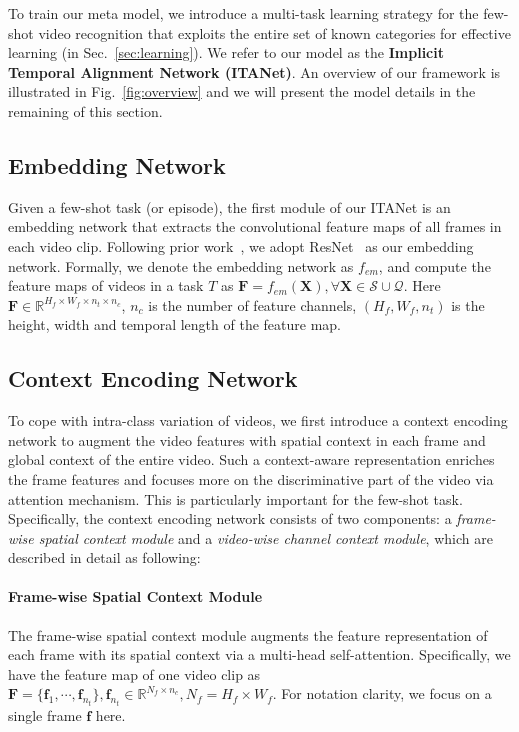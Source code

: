 \documentclass{article}
\begin{document}
To train our meta model, we introduce a multi-task learning strategy for the few-shot video recognition that exploits the entire set of known categories for effective learning (in Sec.~\ref{sec:learning}).
We refer to our model as the \textbf{Implicit Temporal Alignment Network (ITANet)}. An overview of our framework is illustrated in Fig.~\ref{fig:overview} and we will present the model details in the remaining of this section.


\subsection{Embedding Network}\label{sec:embedding}
Given a few-shot task (or episode), the first module of our ITANet is an embedding network that extracts the convolutional feature maps of all frames in each video clip. Following prior work~\cite{cao2020few,zhu2018compound}, we adopt ResNet~\cite{he2016deep} as our embedding network. Formally, we denote the embedding network as $f_{em}$, and compute the feature maps of videos in a task $T$ as $\mathbf{F}=f_{em}(\mathbf{X}), \forall \mathbf{X}\in \mathcal{S}\cup\mathcal{Q}$. Here $\mathbf{F}\in\mathbb{R}^{H_f\times W_f\times n_t\times n_{c}}$, $n_{c}$ is the number of feature channels, $(H_f,W_f,n_t)$ is the height, width and temporal length of the feature map.

\subsection{Context Encoding Network}\label{sec:context}
To cope with intra-class variation of videos, we first introduce a context encoding network to augment the video features with spatial context in each frame and global context of the entire video. Such a context-aware representation enriches the frame features and focuses more on the discriminative part of the video via attention mechanism. This is particularly important for the few-shot task. Specifically, the context encoding network consists of two components: a \textit{frame-wise spatial context module} and a \textit{video-wise channel context module}, which are described in detail as following:

\paragraph{Frame-wise Spatial Context Module} The frame-wise spatial context module augments the feature representation of each frame with its spatial context via a multi-head self-attention. Specifically, we have the feature map of one video clip as $\mathbf{F}=\{\mathbf{f}_{1},\cdots,\mathbf{f}_{n_t}\},\mathbf{f}_{n_t}\in \mathbb{R}^{N_f\times n_{c}}, N_f=H_f\times W_f$. For notation clarity, we focus on a single frame $\mathbf{f}$ here.
\end{document}
